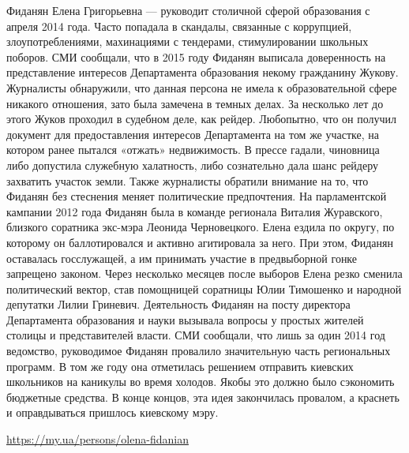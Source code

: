 \begin{itemize}
Фиданян Елена Григорьевна — руководит столичной сферой образования с апреля
2014 года. Часто попадала в скандалы, связанные с коррупцией,
злоупотреблениями, махинациями с тендерами, стимулировании школьных поборов.
СМИ сообщали, что в 2015 году Фиданян выписала доверенность на представление
интересов Департамента образования некому гражданину Жукову. Журналисты
обнаружили, что данная персона не имела к образовательной сфере никакого
отношения, зато была замечена в темных делах. За несколько лет до этого Жуков
проходил в судебном деле, как рейдер. Любопытно, что он получил документ для
предоставления интересов Департамента на том же участке, на котором ранее
пытался «отжать» недвижимость. В прессе гадали, чиновница либо допустила
служебную халатность, либо сознательно дала шанс рейдеру захватить участок
земли. Также журналисты обратили внимание на то, что Фиданян без стеснения
меняет политические предпочтения. На парламентской кампании 2012 года Фиданян
была в команде регионала Виталия Журавского, близкого соратника экс-мэра
Леонида Черновецкого. Елена ездила по округу, по которому он баллотировался и
активно агитировала за него. При этом, Фиданян оставалась госслужащей, а им
принимать участие в предвыборной гонке запрещено законом. Через несколько
месяцев после выборов Елена резко сменила политический вектор, став помощницей
соратницы Юлии Тимошенко и народной депутатки Лилии Гриневич. Деятельность
Фиданян на посту директора Департамента образования и науки вызывала вопросы у
простых жителей столицы и представителей власти. СМИ сообщали, что лишь за один
2014 год ведомство, руководимое Фиданян провалило значительную часть
региональных программ. В том же году она отметилась решением отправить киевских
школьников на каникулы во время холодов. Якобы это должно было сэкономить
бюджетные средства. В конце концов, эта идея закончилась провалом, а краснеть и
оправдываться пришлось киевскому мэру.

\url{https://my.ua/persons/olena-fidanian}



\end{itemize}

